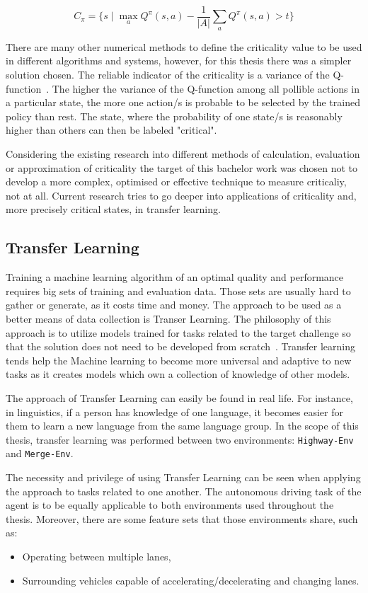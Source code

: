 \[
C_{\pi} = \{ s \mid \max_{a} Q^{\pi}(s, a) - \frac{1}{|A|} \sum_{a} Q^{\pi}(s, a) > t \}
\]


There are many other numerical methods to define the criticality value to be used in different algorithms and systems, however, for this thesis there was a simpler solution chosen. The reliable indicator of the criticality is a variance of the Q-function~\cite{Spielberg_Azaria_2022}. The higher the variance of the Q-function among all pollible actions in a particular state, the more one action/s is probable to be selected by the trained policy than rest. The state, where the probability of one state/s is reasonably higher than others can then be labeled "critical".

Considering the existing research into different methods of calculation, evaluation or approximation of criticality the target of this bachelor work was chosen not to develop a more complex, optimised or effective technique to measure criticaliy, not at all. Current research tries to go deeper into applications of criticality and, more precisely critical states, in transfer learning. 

\subsection{Transfer Learning}\label{sec:subsec_2.2}

Training a machine learning algorithm of an optimal quality and performance requires big sets of training and evaluation data. Those sets are usually hard to gather or generate, as it costs time and money. The approach to be used as a better means of data collection is Transer Learning. The philosophy of this approach is to utilize models trained for tasks related to the target challenge so that the solution does not need to be developed from scratch~\cite{Hosna2022}. Transfer learning tends help the Machine learning to become more universal and adaptive to new tasks as it creates models which own a collection of knowledge of other models. 

The approach of Transfer Learning can easily be found in real life. For instance, in linguistics, if a person has knowledge of one language, it becomes easier for them to learn a new language from the same language group. In the scope of this thesis, transfer learning was performed between two environments: \texttt{Highway-Env} and \texttt{Merge-Env}. 

The necessity and privilege of using Transfer Learning can be seen when applying the approach to tasks related to one another. The autonomous driving task of the agent is to be equally applicable to both environments used throughout the thesis. Moreover, there are some feature sets that those environments share, such as:
\begin{itemize}
    \item Operating between multiple lanes,
    \item Surrounding vehicles capable of accelerating/decelerating and changing lanes.
\end{itemize}

